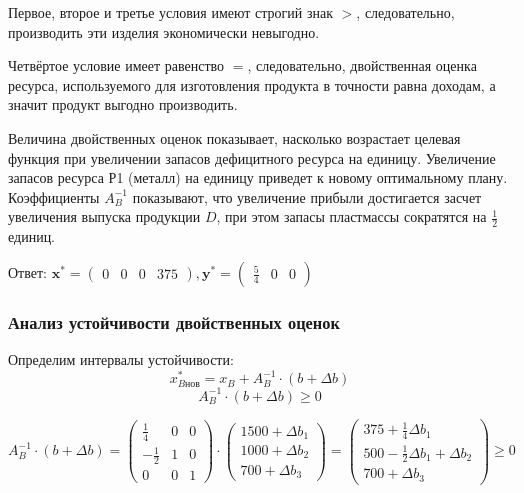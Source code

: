 Первое, второе и третье условия имеют строгий знак $>$, следовательно, производить эти изделия экономически невыгодно.

Четвёртое условие имеет равенство $=$, следовательно, двойственная оценка ресурса, используемого для изготовления продукта в точности равна доходам, а значит продукт выгодно производить.

Величина двойственных оценок показывает, насколько возрастает целевая функция при увеличении запасов дефицитного ресурса на единицу.
Увеличение запасов ресурса Р1 (металл) на единицу приведет к новому оптимальному плану.
Коэффициенты $A_B^{-1}$ показывают, что увеличение прибыли достигается засчет увеличения выпуска продукции $D$, при этом запасы пластмассы сократятся на $\frac{1}{2}$ единиц.

Ответ: $\mathbf{x^*} = \begin{pmatrix} 0 & 0 & 0 & 375 \end{pmatrix}, \mathbf{y^*} = \begin{pmatrix} \frac{5}{4} & 0 & 0 \end{pmatrix}$\label{04-lab-answer}

\subsubsection{Анализ устойчивости двойственных оценок}\label{04-lab-stability}

Определим интервалы устойчивости:
\[x^*_{B\text{нов}} = x_B + A_B^{-1} \cdot (b + \Delta b)\]
\[ A_B^{-1} \cdot (b + \Delta b) \geq 0 \]

\[
    A_B^{-1} \cdot (b + \Delta b) = \begin{pmatrix}
        \frac{1}{4}  & 0 & 0 \\
        -\frac{1}{2} & 1 & 0 \\
        0            & 0 & 1
    \end{pmatrix} \cdot \begin{pmatrix}
        1500 + \Delta b_1 \\
        1000 + \Delta b_2 \\
        700 + \Delta b_3
    \end{pmatrix} = \begin{pmatrix}
        375 + \frac{1}{4} \Delta b_1              \\
        500 - \frac{1}{2} \Delta b_1 + \Delta b_2 \\
        700 + \Delta b_3
    \end{pmatrix} \geq 0
\]

